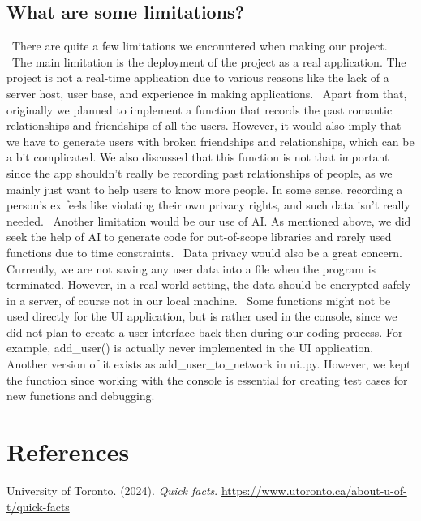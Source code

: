 \documentclass[fontsize=11pt]{article}
\begin{document}
\subsection{What are some limitations?} 
\ There are quite a few limitations we encountered when making our project. 
\ The main limitation is the deployment of the project as a real application. The project is not a real-time application due to various reasons like the lack of a server host, user base, and experience in making applications. 
\ Apart from that, originally we planned to implement a function that records the past romantic relationships and friendships of all the users. However, it would also imply that we have to generate users with broken friendships and relationships, which can be a bit complicated. We also discussed that this function is not that important since the app shouldn't really be recording past relationships of people, as we mainly just want to help users to know more people. In some sense, recording a person's ex feels like violating their own privacy rights, and such data isn't really needed.  
\ Another limitation would be our use of AI. As mentioned above, we did seek the help of AI to generate code for out-of-scope libraries and rarely used functions due to time constraints. 
\ Data privacy would also be a great concern. Currently, we are not saving any user data into a file when the program is terminated. However, in a real-world setting, the data should be encrypted safely in a server, of course not in our local machine. 
\ Some functions might not be used directly for the UI application, but is rather used in the console, since we did not plan to create a user interface back then during our coding process. For example, add_user() is actually never implemented in the UI application. Another version of it exists as add_user_to_network in ui..py. However, we kept the function since working with the console is essential for creating test cases for new functions and debugging.



\section{References}
University of Toronto. (2024). \textit{Quick facts}.
\url{https://www.utoronto.ca/about-u-of-t/quick-facts}


\end{document}
